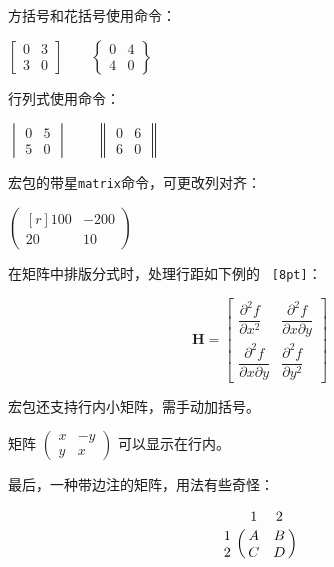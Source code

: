 方括号和花括号使用命令：
\begin{codeshow}
\centering $\begin{bmatrix}
0 & 3 \\ 3 & 0 \end{bmatrix}\qquad
\begin{Bmatrix} 0 & 4 \\
4 & 0 \end{Bmatrix}$
\end{codeshow}

行列式使用命令：
\begin{codeshow}
\centering $\begin{vmatrix}
0 & 5 \\ 5 & 0 \end{vmatrix}\qquad
\begin{Vmatrix} 0 & 6 \\
6 & 0 \end{Vmatrix}$
\end{codeshow}

宏包的带星\texttt{matrix}命令，可更改列对齐：
\begin{codeshow}
$\begin{pmatrix*}[r]
100 & -200 \\ 20 & 10
\end{pmatrix*}$
\end{codeshow}

在矩阵中排版分式时，处理行距如下例的 \texttt{ [8pt]}：
\begin{codeshow}
\[\mathbf{H}=\begin{bmatrix}
\dfrac{\partial^2 f}{\partial x^2} &
\dfrac{\partial^2 f}
{\partial x \partial y} \\[8pt]
\dfrac{\partial^2 f}
{\partial x \partial y} &
\dfrac{\partial^2 f}{\partial y^2}
\end{bmatrix}\]
\end{codeshow}

宏包还支持行内小矩阵，需手动加括号。
\begin{codeshow}
矩阵 $\left(\begin{smallmatrix}
x & -y\\ y & x\end{smallmatrix}
\right)$ 可以显示在行内。
\end{codeshow}

最后，一种带边注的矩阵，用法有些奇怪：
\begin{codeshow}
\[\bordermatrix{& 1 & 2\cr
1 & A & B \cr
2 & C & D \cr} \]
\end{codeshow}

